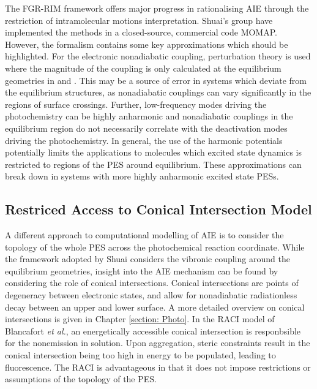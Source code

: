 The \ac{FGR-RIM} framework offers major progress in rationalising AIE through the restriction of intramolecular motions interpretation. Shuai's group have implemented the methods in a closed-source, commercial code MOMAP.\cite{Niu2018} However, the formalism contains some key approximations which should be highlighted. For the electronic nonadiabatic coupling, perturbation theory is used where the magnitude of the coupling is only calculated at the equilibrium geometries in \szero{} and \sone{}. This may be a source of error in systems which deviate from the equilibrium structures, as nonadiabatic couplings can vary significantly in the regions of surface crossings. Further, low-frequency modes driving the photochemistry can be highly anharmonic and nonadiabatic couplings in the equilibrium region do not necessarily correlate with the deactivation modes driving the photochemistry. In general, the use of the harmonic potentials potentially limits the applications to molecules which excited state dynamics is restricted to regions of the PES around equilibrium. These approximations can break down in systems with more highly anharmonic excited state \acp{PES}. 
\subsection{Restriced Access to Conical Intersection Model}\label{section: lom RACI}
A different approach to computational modelling of AIE is to consider the topology of the whole \ac{PES} across the photochemical reaction coordinate. While the framework adopted by Shuai considers the vibronic coupling around the equilibrium geometries, insight into the AIE mechanism can be found by considering the role of conical intersections. Conical intersections are points of degeneracy between electronic states, and allow for nonadiabatic radiationless decay between an upper and lower surface. A more detailed overview on conical intersections is given in Chapter \ref{section: Photo}. In the \ac{RACI} model of Blancafort \textit{et al.}, an energetically accessible conical intersection is responbsible for the nonemission in solution. Upon aggregation, steric constraints result in the conical intersection being too high in energy to be populated, leading to fluorescence.\cite{Peng2016} The \ac{RACI} is advantageous in that it does not impose restrictions or assumptions of the topology of the \ac{PES}.  

